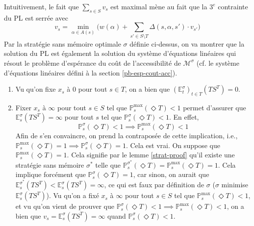 \documentclass[12pt,a4paper]{report}
\theoremstyle{definition}%
\theoremstyle{remark}
\newcommand{\pr}{\mathbb{P}}
\begin{document}
	Intuitivement, le fait que $\sum_{s \in S} v_s$ est maximal
	mène au fait que la $3^e$ contrainte du PL est serrée avec
	\[ v_s = \min_{\alpha \in A(s)} \bigg( w(\alpha) + \sum_{s' \in S \setminus T} \Delta(s, \alpha, s') \cdot v_{s'} \bigg) \]
	Par la stratégie sans mémoire optimale $\sigma$ définie ci-dessus, on
	va montrer que la solution du PL est également la solution du système d'équations linéaires qui résout le problème d'espérance du coût de l'accessibilité de $\mathcal{M}^\sigma$
 (cf. le système d'équations linéaires défini à la section
\ref{pb-esp-cout-acc}).
	\begin{enumerate}
\item Vu qu'on fixe $x_s$ à 0 pour tout $s \in T$, on a bien que $ (\mathbb{E}^\sigma_{t})_{t \in T}(TS^T) = 0$.
\item Fixer $x_s$ à $\infty$ pour tout $s \in S$ tel que $\pr^{\max}_s (\Diamond T) < 1$
permet d'assurer que
$\mathbb{E}_s^\sigma(TS^T) = \infty$ pour tout $s$ tel que $\pr^{\sigma}_s (\Diamond T) < 1$. En effet, \[\pr^{\sigma}_s (\Diamond T) < 1 \implies \pr^{\max}_s (\Diamond T)< 1\]
Afin de s'en convaincre, on prend la contraposée de cette implication, i.e.,\\
$\pr_s^{\max}(\Diamond T) = 1 \implies \pr_s^{\sigma}(\Diamond T) = 1$.
Cela est vrai. On suppose que $\pr_s^{\max}(\Diamond T) = 1$. Cela signifie
par le lemme \ref{strat-proof} qu'il existe une stratégie sans mémoire
$\sigma^*$ telle que $\pr_s^{\sigma^*}(\Diamond T) =
\pr^{\max}_s(\Diamond T) = 1$. Cela implique forcément que
$\pr^{\sigma}_s(\Diamond T) = 1$, car sinon, on aurait que
$\mathbb{E}^{\sigma^*}_s (TS^T) < \mathbb{E}^\sigma_s(TS^T) =
\infty$, ce qui est faux par définition de $\sigma$
($\sigma$ minimise $\mathbb{E}^\sigma_s(TS^T)$). Vu qu'on a fixé $x_s$ à $\infty$ pour tout $s \in S$ tel que $\pr^{\max}_s(\Diamond T) < 1$, et vu qu'on vient de prouver que $\pr^{\sigma}_s(\Diamond T) < 1 \implies \pr^{\max}_s(\Diamond T)
< 1$, on a bien que $v_s = \mathbb{E}_s^\sigma (TS^T)= \infty$ quand $\pr^{\sigma}_s
(\Diamond T) < 1$.



\end{enumerate}
\end{document}
